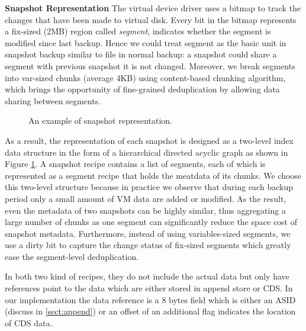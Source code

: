 {\bf Snapshot Representation}
The virtual device driver uses a bitmap to track the changes 
that have been made to virtual disk.
Every bit in the bitmap represents a fix-sized (2MB) region called \textit{segment}, indicates whether the segment
is modified since last backup. Hence we could treat segment as the basic unit 
in snapshot backup similar to
file in normal backup: a snapshot could share a segment with previous snapshot it is not changed. 
Moreover, we break 
segments into var-sized chunks (average 4KB) using content-based chunking algorithm,
which brings the opportunity of fine-grained deduplication by
allowing data sharing between segments.

\begin{figure}[htbp]
  \centering
  \caption{An example of snapshot representation.}
  \label{fig:snapshot_rep}
\end{figure}
As a result, the representation of each snapshot is designed as a two-level index data structure 
in the form of a hierarchical directed acyclic graph as shown in Figure \ref{fig:snapshot_rep}.
A snapshot recipe contains a list of segments, each of which is represented as a segment recipe
that holds the meatdata of its chunks. We choose this two-level structure because in practice we
observe that during each backup period only a small amount of VM data are added or modified. 
As the result, even the metadata of two snapshots can be highly similar, 
thus aggregating a large number of chunks as one segment can significantly reduce the space cost of snapshot metadata.
Furthermore, instead of using variables-sized segments, we use a dirty bit to capture the change status of fix-sized
segments which greatly ease the segment-level deduplication.

In both two kind of recipes, 
they do not include the actual data but only have
 references point to the data which are either stored in append store or CDS.
In our implementation the data reference is a 8 bytes field which is either an 
ASID (discuss in \ref{sect:append}) or an offset of an additional flag indicates
the location of CDS data.

